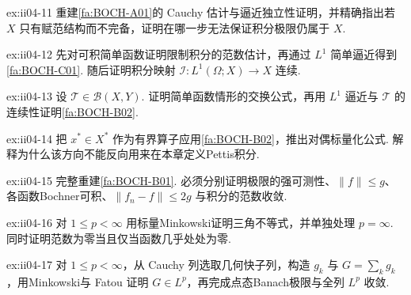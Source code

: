 \begin{FAExercise}{ex:ii04-11}
重建\autoref{fa:BOCH-A01}的 Cauchy 估计与逼近独立性证明，并精确指出若 \(\displaystyle X\) 只有赋范结构而不完备，证明在哪一步无法保证积分极限仍属于 \(\displaystyle X\).
\end{FAExercise}

\begin{FAExercise}{ex:ii04-12}
先对可积简单函数证明限制积分的范数估计，再通过 \(\displaystyle L^1\) 简单逼近得到\autoref{fa:BOCH-C01}. 随后证明积分映射 \(\displaystyle\mathcal I:L^1(\Omega;X)\to X\) 连续.
\end{FAExercise}

\begin{FAExercise}[有界算子与积分交换]{ex:ii04-13}
设 \(\displaystyle\mathcal T\in\mathcal B(X,Y)\). 证明简单函数情形的交换公式，再用 \(\displaystyle L^1\) 逼近与 \(\displaystyle\mathcal T\) 的连续性证明\autoref{fa:BOCH-B02}.
\end{FAExercise}

\begin{FAExercise}[对偶标量化边界]{ex:ii04-14}
把 \(\displaystyle x^*\in X^*\) 作为有界算子应用\autoref{fa:BOCH-B02}，推出对偶标量化公式. 解释为什么该方向不能反向用来在本章定义Pettis积分.
\end{FAExercise}

\begin{FAExercise}[Bochner支配收敛]{ex:ii04-15}
完整重建\autoref{fa:BOCH-B01}. 必须分别证明极限的强可测性、\(\displaystyle\|f\|\leqslant g\)、各函数Bochner可积、\(\displaystyle\|f_n-f\|\leqslant2g\) 与积分的范数收敛.
\end{FAExercise}

\begin{FAExercise}{ex:ii04-16}
对 \(\displaystyle1\leqslant p<\infty\) 用标量Minkowski证明三角不等式，并单独处理 \(\displaystyle p=\infty\). 同时证明范数为零当且仅当函数几乎处处为零.
\end{FAExercise}

\begin{FAExercise}{ex:ii04-17}
对 \(\displaystyle1\leqslant p<\infty\)，从 Cauchy 列选取几何快子列，构造 \(\displaystyle g_k\) 与 \(\displaystyle G=\sum_kg_k\)，用Minkowski与 Fatou 证明 \(\displaystyle G\in L^p\)，再完成点态Banach极限与全列 \(\displaystyle L^p\) 收敛.
\end{FAExercise}

